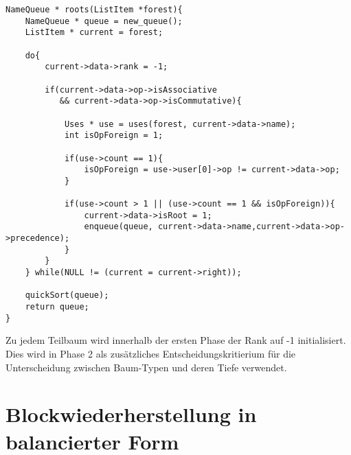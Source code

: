 \begin{lstlisting}[caption=Phase 1: Roots, label=list:roots]
NameQueue * roots(ListItem *forest){
	NameQueue * queue = new_queue();
	ListItem * current = forest;
	
	do{
		current->data->rank = -1;
		
		if(current->data->op->isAssociative 
		   && current->data->op->isCommutative){
			
			Uses * use = uses(forest, current->data->name);
			int isOpForeign = 1;          
			
			if(use->count == 1){
				isOpForeign = use->user[0]->op != current->data->op;
			}
			
			if(use->count > 1 || (use->count == 1 && isOpForeign)){               
				current->data->isRoot = 1;
				enqueue(queue, current->data->name,current->data->op->precedence);
			}
		}
	} while(NULL != (current = current->right));
	
	quickSort(queue);
	return queue;
}
\end{lstlisting}

Zu jedem Teilbaum wird innerhalb der ersten Phase der Rank auf -1 initialisiert. Dies wird in Phase 2 als zusätzliches Entscheidungskritierium für die  Unterscheidung zwischen Baum-Typen und deren Tiefe verwendet.

\section{Blockwiederherstellung in balancierter Form}